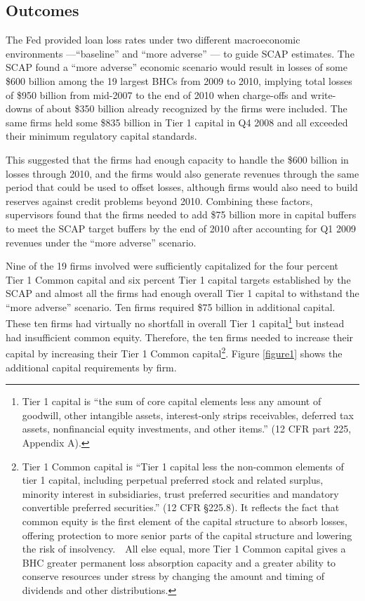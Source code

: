 \documentclass[12pt]{article}
\begin{document}
\subsection{Outcomes}

The Fed provided loan loss rates under two different macroeconomic
environments ---``baseline'' and ``more adverse'' --- to guide SCAP
estimates. The SCAP found a ``more adverse'' economic scenario would result
in losses of some \$600 billion among the 19 largest BHCs from 2009 to
2010, implying total losses of \$950 billion from mid-2007 to the end of
2010 when charge-offs and write-downs of
about \$350 billion already recognized by the firms were included. The same firms held some \$835
billion in Tier 1 capital in Q4 2008 and all exceeded their minimum
regulatory capital standards.\citep{Results}

This suggested that the firms had enough capacity to handle the \$600 billion
in losses through 2010, and the firms would also generate revenues
through the same period that could be used to offset losses, although
firms would also need to build reserves against credit problems beyond
2010. Combining these factors, supervisors found that the firms needed to add
\$75 billion more in capital buffers to meet the SCAP target buffers by
the end of 2010 after accounting for Q1 2009 revenues under the ``more
adverse'' scenario.

Nine of the 19 firms involved were sufficiently capitalized for the four
percent Tier 1 Common capital and six percent Tier 1 capital targets
established by the SCAP and almost all the firms had enough overall Tier
1 capital to withstand the ``more adverse'' scenario. Ten firms required
\$75 billion in additional capital. These ten firms had virtually no
shortfall in overall Tier 1 capital\footnote{Tier 1 capital is ``the sum
  of core capital elements less any amount of goodwill, other intangible
  assets, interest-only strips receivables, deferred tax assets,
  nonfinancial equity investments, and other items.'' (12 CFR part 225,
  Appendix A).} but instead had insufficient common equity. Therefore,
the ten firms needed to increase their capital by increasing their Tier 1
Common capital\footnote{Tier 1 Common capital is ``Tier 1 capital less
  the non-common elements of tier 1 capital, including perpetual
  preferred stock and related surplus, minority interest in
  subsidiaries, trust preferred securities and mandatory convertible
  preferred securities.'' (12 CFR \S 225.8). It reflects the fact that
  common equity is the first element of the capital structure to absorb
  losses, offering protection to more senior parts of the capital
  structure and lowering the risk of insolvency.~~All else equal, more
  Tier 1 Common capital gives a BHC greater permanent loss absorption
  capacity and a greater ability to conserve resources under stress by
  changing the amount and timing of dividends and other distributions.\citep{Results}}. Figure \ref{figure1} shows the additional capital requirements by firm.
\end{document}
